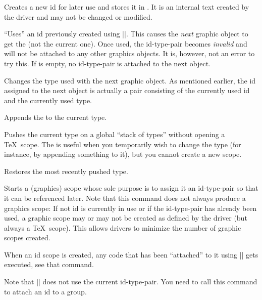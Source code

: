 \begin{command}{\pgfsys@new@id{}}
    Creates a new id for later use and stores it in . It is an
    internal text created by the driver and may not be changed or modified.
\end{command}

\begin{command}{\pgfsys@use@id{}}
    ``Uses'' an id previously created using |\pgfsys@new@id|. This causes the
    \emph{next} graphic object to get the  (not the current one). Once
    used, the id-type-pair becomes \emph{invalid} and will not be attached to
    any other graphics objects. It is, however, not an error to try this. If
     is empty, no id-type-pair is attached to the next object.
\end{command}

\begin{command}{\pgfsys@use@type{}}
    Changes the type used with the next graphic object. As mentioned earlier,
    the id assigned to the next object is actually a pair consisting of the
    currently used id and the currently used type.
\end{command}

\begin{command}{\pgfsys@append@type{}}
    Appends the  to the current type.
\end{command}

\begin{command}{\pgfsys@push@type}
    Pushes the current type on a global ``stack of types'' without opening a
    \TeX\ scope. The is useful when you temporarily wish to change the type
    (for instance, by appending something to it), but you cannot create a new
    scope.
\end{command}

\begin{command}{\pgfsys@pop@type}
    Restores the most recently pushed type.
\end{command}

\begin{command}{\pgfsys@begin@idscope}
    Starts a (graphics) scope whose sole purpose is to assign it an
    id-type-pair so that it can be referenced later. Note that this command
    does not always produce a graphics scope: If not id is currently in use or
    if the id-type-pair has already been used, a graphic scope may or may not
    be created as defined by the driver (but always a \TeX\ scope). This allows
    drivers to minimize the number of graphic scopes created.

    When an id scope is created, any code that has been ``attached'' to it
    using |\pgfsys@attach@to@id| gets executed, see that command.

    Note that |\pgfsys@beginscope| does not use the current id-type-pair. You
    need to call this command to attach an id to a group.
\end{command}

